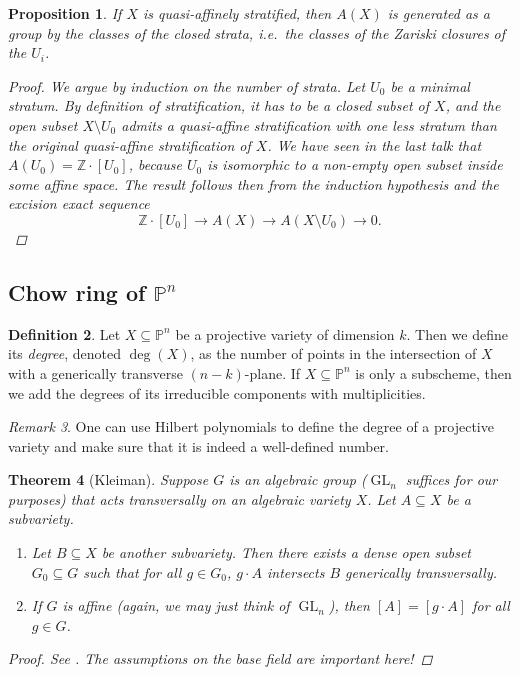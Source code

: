 \documentclass[12pt,a4paper]{amsart}
\theoremstyle{plain}
\newtheorem{thm}{Theorem}[section]
\newtheorem{prop}[thm]{Proposition}
\theoremstyle{definition}
\newtheorem{defn}[thm]{Definition}
\theoremstyle{remark}
\newtheorem{rem}[thm]{Remark}
\begin{document}
\begin{prop}
    If $X$ is quasi-affinely stratified, then $A(X)$ is generated as a group by the classes of the closed strata, i.e.~the classes of the Zariski closures of the $U_{i}$.
    \begin{proof}
	We argue by induction on the number of strata.
	Let $U_{0}$ be a minimal stratum.
	By definition of stratification, it has to be a closed subset of $X$, and the open subset $X\setminus U_{0}$ admits a quasi-affine stratification with one less stratum than the original quasi-affine stratification of $X$.
	We have seen in the last talk that $A(U_{0})=\mathbb{Z}\cdot [U_{0}]$, because $U_{0}$ is isomorphic to a non-empty open subset inside some affine space.
	The result follows then from the induction hypothesis and the excision exact sequence
	\[ \mathbb{Z}\cdot [U_{0}]\to A(X)\to A(X\setminus U_{0})\to 0. \]
    \end{proof}
\end{prop}

\subsection{Chow ring of $\mathbb{P}^{n}$}

\begin{defn}
    Let $X\subseteq \mathbb{P}^{n}$ be a projective variety of dimension $k$.
    Then we define its \textit{degree}, denoted $\deg(X)$, as the number of points in the intersection of $X$ with a generically transverse $(n-k)$-plane.
    If $X\subseteq \mathbb{P}^{n}$ is only a subscheme, then we add the degrees of its irreducible components with multiplicities.
\end{defn}

\begin{rem}
    One can use Hilbert polynomials to define the degree of a projective variety and make sure that it is indeed a well-defined number.
\end{rem}

\begin{thm}[Kleiman]
    Suppose $G$ is an algebraic group ($\operatorname{GL}_{n}$ suffices for our purposes) that acts transversally on an algebraic variety $X$.
    Let $A\subseteq X$ be a subvariety.
    \begin{enumerate}
	\item Let $B\subseteq X$ be another subvariety.
	    Then there exists a dense open subset $G_{0}\subseteq G$ such that for all $g\in G_{0}$, $g\cdot A$ intersects $B$ generically transversally.
	\item If $G$ is affine (again, we may just think of $\operatorname{GL}_{n}$), then $[A]=[g\cdot A]$ for all $g\in G$.
    \end{enumerate}
    \begin{proof}
	See \cite[Theorem 1.7]{eh16}.
	The assumptions on the base field are important here!
    \end{proof}
\end{thm}
\end{document}

